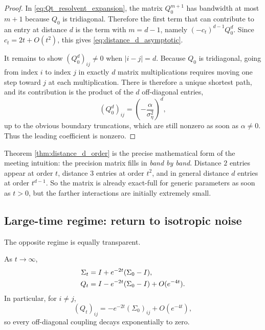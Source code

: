 \documentclass[11pt]{article}
\begin{document}
\begin{proof}
In \eqref{eq:Qt_resolvent_expansion}, the matrix $Q_0^{m+1}$ has bandwidth at most $m+1$ because $Q_0$ is tridiagonal. Therefore the first term that can contribute to an entry at distance $d$ is the term with $m=d-1$, namely $(-c_t)^{d-1}Q_0^d$. Since $c_t=2t+O(t^2)$, this gives \eqref{eq:distance_d_asymptotic}.

It remains to show $(Q_0^d)_{ij}\neq 0$ when $|i-j|=d$. Because $Q_0$ is tridiagonal, going from index $i$ to index $j$ in exactly $d$ matrix multiplications requires moving one step toward $j$ at each multiplication. There is therefore a unique shortest path, and its contribution is the product of the $d$ off-diagonal entries,
\begin{equation}
 (Q_0^d)_{ij}=\left(-\frac{\alpha}{\sigma_\eta^2}\right)^d,
\end{equation}
up to the obvious boundary truncations, which are still nonzero as soon as $\alpha\neq 0$. Thus the leading coefficient is nonzero.
\end{proof}

Theorem \ref{thm:distance_d_order} is the precise mathematical form of the meeting intuition: the precision matrix fills in \emph{band by band}. Distance $2$ entries appear at order $t$, distance $3$ entries at order $t^2$, and in general distance $d$ entries at order $t^{d-1}$. So the matrix is already exact-full for generic parameters as soon as $t>0$, but the farther interactions are initially extremely small.

\subsection{Large-time regime: return to isotropic noise}

The opposite regime is equally transparent.

\begin{proposition}\label{prop:large_time}
As $t\to\infty$,
\begin{align}
 \Sigma_t &= I+e^{-2t}(\Sigma_0-I), \\
 Q_t &= I-e^{-2t}(\Sigma_0-I)+O(e^{-4t}).
\end{align}
In particular, for $i\neq j$,
\begin{equation}
 (Q_t)_{ij}=-e^{-2t}(\Sigma_0)_{ij}+O(e^{-4t}),
\end{equation}
so every off-diagonal coupling decays exponentially to zero.
\end{proposition}
\end{document}
